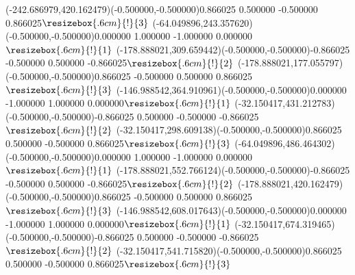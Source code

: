 \color{ASYcolor}
\fontsize{12.000000}{14.400000}\selectfont
\ASYalignT(-242.686979,420.162479)(-0.500000,-0.500000){0.866025 0.500000 -0.500000 0.866025}{$\resizebox{.6cm}{!}{3}$}%
\color{ASYcolor}
\fontsize{12.000000}{14.400000}\selectfont
\ASYalignT(-64.049896,243.357620)(-0.500000,-0.500000){0.000000 1.000000 -1.000000 0.000000}{$\resizebox{.6cm}{!}{1}$}%
\color{ASYcolor}
\fontsize{12.000000}{14.400000}\selectfont
\ASYalignT(-178.888021,309.659442)(-0.500000,-0.500000){-0.866025 -0.500000 0.500000 -0.866025}{$\resizebox{.6cm}{!}{2}$}%
\color{ASYcolor}
\fontsize{12.000000}{14.400000}\selectfont
\ASYalignT(-178.888021,177.055797)(-0.500000,-0.500000){0.866025 -0.500000 0.500000 0.866025}{$\resizebox{.6cm}{!}{3}$}%
\color{ASYcolor}
\fontsize{12.000000}{14.400000}\selectfont
\ASYalignT(-146.988542,364.910961)(-0.500000,-0.500000){0.000000 -1.000000 1.000000 0.000000}{$\resizebox{.6cm}{!}{1}$}%
\color{ASYcolor}
\fontsize{12.000000}{14.400000}\selectfont
\ASYalignT(-32.150417,431.212783)(-0.500000,-0.500000){-0.866025 0.500000 -0.500000 -0.866025}{$\resizebox{.6cm}{!}{2}$}%
\color{ASYcolor}
\fontsize{12.000000}{14.400000}\selectfont
\ASYalignT(-32.150417,298.609138)(-0.500000,-0.500000){0.866025 0.500000 -0.500000 0.866025}{$\resizebox{.6cm}{!}{3}$}%
\color{ASYcolor}
\fontsize{12.000000}{14.400000}\selectfont
\ASYalignT(-64.049896,486.464302)(-0.500000,-0.500000){0.000000 1.000000 -1.000000 0.000000}{$\resizebox{.6cm}{!}{1}$}%
\color{ASYcolor}
\fontsize{12.000000}{14.400000}\selectfont
\ASYalignT(-178.888021,552.766124)(-0.500000,-0.500000){-0.866025 -0.500000 0.500000 -0.866025}{$\resizebox{.6cm}{!}{2}$}%
\color{ASYcolor}
\fontsize{12.000000}{14.400000}\selectfont
\ASYalignT(-178.888021,420.162479)(-0.500000,-0.500000){0.866025 -0.500000 0.500000 0.866025}{$\resizebox{.6cm}{!}{3}$}%
\color{ASYcolor}
\fontsize{12.000000}{14.400000}\selectfont
\ASYalignT(-146.988542,608.017643)(-0.500000,-0.500000){0.000000 -1.000000 1.000000 0.000000}{$\resizebox{.6cm}{!}{1}$}%
\color{ASYcolor}
\fontsize{12.000000}{14.400000}\selectfont
\ASYalignT(-32.150417,674.319465)(-0.500000,-0.500000){-0.866025 0.500000 -0.500000 -0.866025}{$\resizebox{.6cm}{!}{2}$}%
\color{ASYcolor}
\fontsize{12.000000}{14.400000}\selectfont
\ASYalignT(-32.150417,541.715820)(-0.500000,-0.500000){0.866025 0.500000 -0.500000 0.866025}{$\resizebox{.6cm}{!}{3}$}%
